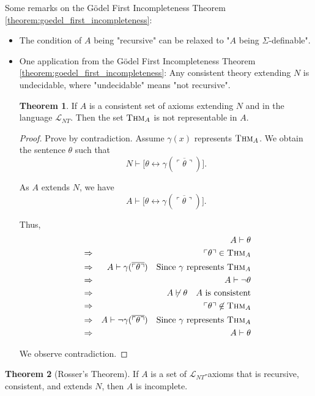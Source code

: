 \documentclass[11pt,letterpaper]{book}
\theoremstyle{definition}
\newtheorem{theorem}{Theorem}[section]
\begin{document}
Some remarks on the G\"odel First Incompleteness Theorem \ref{theorem:goedel_first_incompleteness}:
\begin{itemize}
\item{The condition of $A$ being "recursive" can be relaxed to "$A$ being $\Sigma$-definable".}
\item{One application from the G\"odel First Incompleteness Theorem \ref{theorem:goedel_first_incompleteness}: Any consistent theory extending $N$ is undecidable, where "undecidable" means "not recursive". 
\begin{theorem}
If $A$ is a consistent set of axioms extending $N$ and in the language $\mathcal{L}_{NT}$. Then the set $\text{\textsc{Thm}}_A $ is not representable in $A$.
\end{theorem}

\begin{proof}
Prove by contradiction. Assume $\gamma(x)$ represents $\text{\textsc{Thm}}_A$. We obtain the sentence $\theta$ such that
$$  N \vdash \bigg[ \theta \leftrightarrow \gamma ( \overline{\ulcorner \theta \urcorner} ) \bigg] . $$

As $A$ extends $N$, we have
$$  A \vdash \bigg[ \theta \leftrightarrow \gamma ( \overline{\ulcorner \theta \urcorner} ) \bigg] . $$

Thus,
\begin{eqnarray*}
& & A \vdash \theta \\
& \Rightarrow & \ulcorner \theta \urcorner \in \text{\textsc{Thm}}_A \\
& \Rightarrow & A \vdash \gamma ( \overline{\ulcorner \theta \urcorner} ) \quad \text{Since $\gamma$ represents }\text{\textsc{Thm}}_A \\
& \Rightarrow & A \vdash \lnot \theta \\
& \Rightarrow & A \not \vdash \theta \quad \text{$A$ is consistent} \\
& \Rightarrow & \ulcorner \theta \urcorner \not \in \text{\textsc{Thm}}_A \\
& \Rightarrow & A \vdash \lnot \gamma ( \overline{\ulcorner \theta \urcorner} ) \quad \text{Since $\gamma$ represents }\text{\textsc{Thm}}_A \\
& \Rightarrow & A \vdash \theta
\end{eqnarray*}

We observe contradiction.
\end{proof}
}
\end{itemize}

\begin{theorem}[Rosser's Theorem]
\label{theorem:rosser}
If $A$ is a set of $\mathcal{L}_{NT}$-axioms that is recursive, consistent, and extends $N$, then $A$ is incomplete.
\end{theorem}
\end{document}
